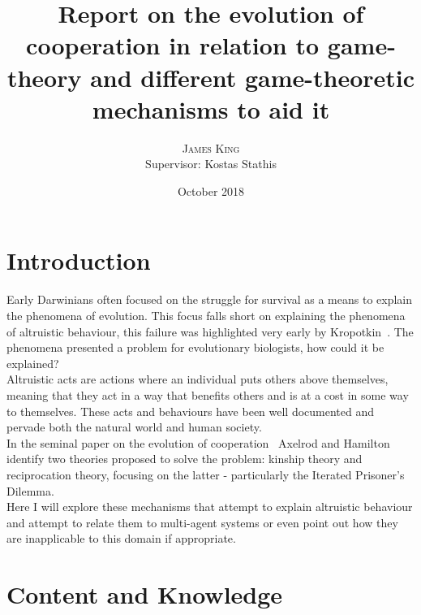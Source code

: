 \documentclass[twoside,twocolumn]{article}
\title{Report on the evolution of cooperation in relation to game-theory and different game-theoretic mechanisms to aid it} %
\author{%
\textsc{James King} \\%
\normalsize Supervisor: Kostas Stathis \\ %
}
\date{October 2018} %
\begin{document}


\maketitle


\section{Introduction}
Early Darwinians often focused on the struggle for survival as a means to explain the phenomena of evolution. This focus falls short on explaining the phenomena of altruistic behaviour, this failure was highlighted very early by Kropotkin~\cite{arithmetics_of_mutual_help}. The phenomena presented a problem for evolutionary biologists, how could it be explained?\\
Altruistic acts are actions where an individual puts others above themselves, meaning that they act in a way that benefits others and is at a cost in some way to themselves. These acts and behaviours have been well documented and pervade both the natural world and human society.\\
In the seminal paper on the evolution of cooperation~\cite{evolution_of_cooperation} Axelrod and Hamilton identify two theories proposed to solve the problem: kinship theory and reciprocation theory, focusing on the latter - particularly the Iterated Prisoner's Dilemma.\\ 
Here I will explore these mechanisms that attempt to explain altruistic behaviour and attempt to relate them to multi-agent systems or even point out how they are inapplicable to this domain if appropriate.\\


\section{Content and Knowledge}
\end{document}
